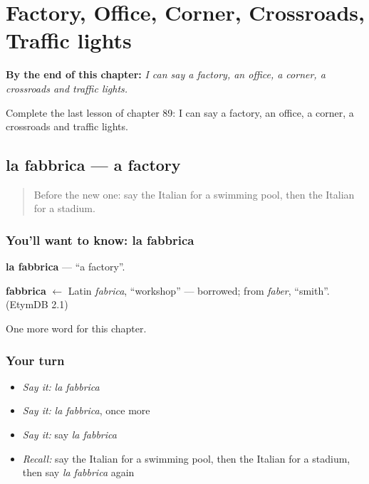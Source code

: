 
\chapter{Factory, Office, Corner, Crossroads, Traffic lights}
\label{ch:it-factory-office-corner-crossroads-traffic-lights}

\begin{chapteropening}
\textbf{By the end of this chapter:} \emph{I can say a factory, an office, a corner, a crossroads and traffic lights.}

Complete the last lesson of chapter 89: I can say a factory, an office, a corner, a crossroads and traffic lights.
\end{chapteropening}

\section[la fabbrica]{la fabbrica — a factory}

\label{lesson:IT-C89-fabbrica}



\begin{quote}
Before the new one: say the Italian for a swimming pool, then the Italian for a stadium.
\end{quote}

\subsection*{You'll want to know: la fabbrica}
\textbf{la fabbrica} — \textquotedblleft{}a factory\textquotedblright{}.

\begin{cousinweb}
\textbf{fabbrica} $\leftarrow$ Latin \emph{fabrica}, \textquotedblleft{}workshop\textquotedblright{} — borrowed; from \emph{faber}, \textquotedblleft{}smith\textquotedblright{}. (EtymDB 2.1)
\end{cousinweb}

\begin{grammarlens}[title={What you've built}]
One more word for this chapter.
\end{grammarlens}

\subsection*{Your turn}
\begin{itemize}
\raggedright
  \item \emph{Say it:} \emph{la fabbrica}
  \item \emph{Say it:} \emph{la fabbrica}, once more
  \item \emph{Say it:} say \emph{la fabbrica}
  \item \emph{Recall:} say the Italian for a swimming pool, then the Italian for a stadium, then say \emph{la fabbrica} again
\end{itemize}

